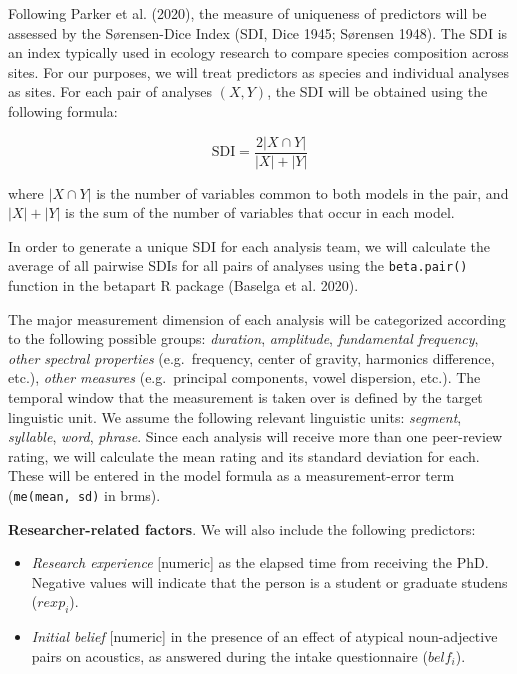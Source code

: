 \documentclass[
  12pt,
]{article}
\providecommand{\tightlist}{%
  \setlength{\itemsep}{0pt}\setlength{\parskip}{0pt}}
\begin{document}
Following Parker et al. (2020), the measure of uniqueness of predictors will be assessed by the Sørensen-Dice Index (SDI, Dice 1945; Sørensen 1948).
The SDI is an index typically used in ecology research to compare species composition across sites.
For our purposes, we will treat predictors as species and individual analyses as sites.
For each pair of analyses \((X, Y)\), the SDI will be obtained using the following formula:

\[\text{SDI} = \frac{2|X \cap Y|}{|X|+|Y|}\]

where \(|X \cap Y|\) is the number of variables common to both models in the pair, and \(|X|+|Y|\) is the sum of the number of variables that occur in each model.

In order to generate a unique SDI for each analysis team, we will calculate the average of all pairwise SDIs for all pairs of analyses using the \texttt{beta.pair()} function in the betapart R package (Baselga et al. 2020).

The major measurement dimension of each analysis will be categorized according to the following possible groups: \emph{duration}, \emph{amplitude}, \emph{fundamental frequency}, \emph{other spectral properties} (e.g.~frequency, center of gravity, harmonics difference, etc.), \emph{other measures} (e.g.~principal components, vowel dispersion, etc.).
The temporal window that the measurement is taken over is defined by the target linguistic unit.
We assume the following relevant linguistic units: \emph{segment}, \emph{syllable}, \emph{word}, \emph{phrase}.
Since each analysis will receive more than one peer-review rating, we will calculate the mean rating and its standard deviation for each.
These will be entered in the model formula as a measurement-error term (\texttt{me(mean,\ sd)} in brms).

\textbf{Researcher-related factors}. We will also include the following predictors:

\begin{itemize}
\tightlist
\item
  \emph{Research experience} {[}numeric{]} as the elapsed time from receiving the PhD. Negative values will indicate that the person is a student or graduate studens (\(rexp_i\)).
\item
  \emph{Initial belief} {[}numeric{]} in the presence of an effect of atypical noun-adjective pairs on acoustics, as answered during the intake questionnaire (\(belf_i\)).
\end{itemize}
\end{document}
